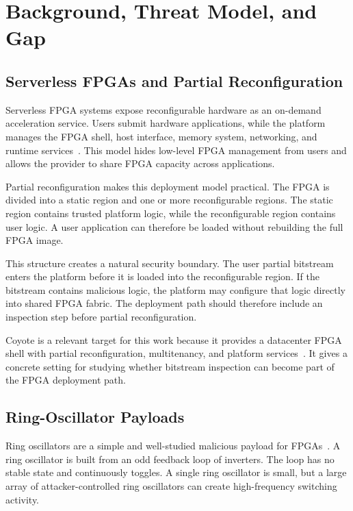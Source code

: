 \chapter{Background, Threat Model, and Gap}
\label{ch:background-threat-gap}

\section{Serverless FPGAs and Partial Reconfiguration}
\label{sec:serverless-fpgas}

Serverless FPGA systems expose reconfigurable hardware as an on-demand acceleration service. Users submit hardware applications, while the platform manages the FPGA shell, host interface, memory system, networking, and runtime services~\cite{korolija2020os,ramhorst2025coyote,mainas2025f3}. This model hides low-level FPGA management from users and allows the provider to share FPGA capacity across applications.

Partial reconfiguration makes this deployment model practical. The FPGA is divided into a static region and one or more reconfigurable regions. The static region contains trusted platform logic, while the reconfigurable region contains user logic. A user application can therefore be loaded without rebuilding the full FPGA image.

This structure creates a natural security boundary. The user partial bitstream enters the platform before it is loaded into the reconfigurable region. If the bitstream contains malicious logic, the platform may configure that logic directly into shared FPGA fabric. The deployment path should therefore include an inspection step before partial reconfiguration.

Coyote is a relevant target for this work because it provides a datacenter FPGA shell with partial reconfiguration, multitenancy, and platform services~\cite{korolija2020os,ramhorst2025coyote}. It gives a concrete setting for studying whether bitstream inspection can become part of the FPGA deployment path.

\section{Ring-Oscillator Payloads}
\label{sec:ring-oscillators}

Ring oscillators are a simple and well-studied malicious payload for FPGAs~\cite{gnad2017voltage,la2020fpgadefender,la2021denial,provelengios2020power}. A ring oscillator is built from an odd feedback loop of inverters. The loop has no stable state and continuously toggles. A single ring oscillator is small, but a large array of attacker-controlled ring oscillators can create high-frequency switching activity.

